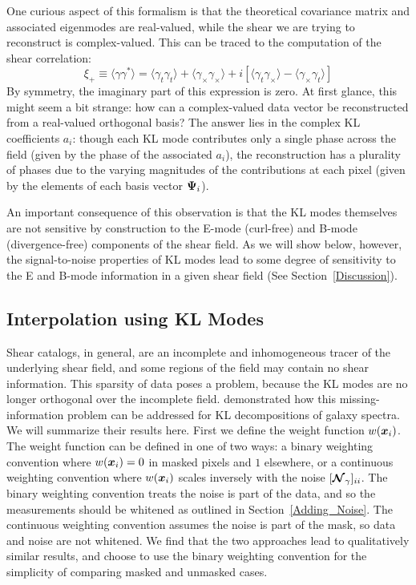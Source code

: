 One curious aspect of this formalism is that the theoretical covariance
matrix and associated eigenmodes are real-valued, while the shear we are
trying to reconstruct is complex-valued.  This can be traced
to the computation of the shear correlation:
\begin{equation}
  \xi_+ \equiv \langle\gamma \gamma^*\rangle
  = \langle \gamma_t\gamma_t\rangle + \langle \gamma_\times\gamma_\times\rangle
  + i[\langle\gamma_t\gamma_\times\rangle - \langle\gamma_\times\gamma_t\rangle]
\end{equation}
By symmetry, the imaginary part of this expression
is zero. At first glance, this might seem a bit strange:
how can a complex-valued data vector be reconstructed from a
real-valued orthogonal basis?  The answer lies in the complex KL coefficients
$a_i$: though each KL mode contributes only a single phase across the field
(given by the phase of the associated $a_i$), the reconstruction has a 
plurality of phases due to the varying magnitudes of the contributions 
at each pixel (given by the elements of each basis vector $\boldsymbol{\Psi}_i$).

An important consequence of this observation is that the KL modes 
themselves are not sensitive by construction to the E-mode (curl-free) 
and B-mode (divergence-free) components of the shear field. As we will
show below, however, the signal-to-noise properties of KL modes lead to 
some degree of sensitivity to the E and B-mode information in a given
shear field (See Section~\ref{Discussion}).


\subsection{Interpolation using KL Modes}
\label{KL_Interpolation}
Shear catalogs, in general, are an incomplete and inhomogeneous
tracer of the underlying shear field, and some regions of the field may 
contain no shear information.  This sparsity of data poses a problem,
because the KL modes are no longer orthogonal over the incomplete field.
\citet{Connolly99} demonstrated how this missing-information problem can be 
addressed for KL decompositions of galaxy
spectra. We will summarize their results here.  First we define the weight 
function $w(\boldsymbol{x}_i)$.
The weight function can be defined in one of two ways: 
a binary weighting convention where
$w(\boldsymbol{x}_i)=0$ in masked pixels and $1$ elsewhere, or a continuous 
weighting convention where $w(\boldsymbol{x}_i)$ scales inversely with the noise 
$[\boldsymbol{\mathcal{N}}_\gamma]_{ii}$.
The binary weighting convention treats the noise is part of the data, 
and so the measurements should be whitened as outlined in 
Section~\ref{Adding_Noise}.  
The continuous weighting convention assumes the noise is part of the mask, 
so data and noise are not whitened.
We find that the two approaches lead to qualitatively similar results, 
and choose to use the binary weighting convention for the simplicity of 
comparing masked and unmasked cases.

